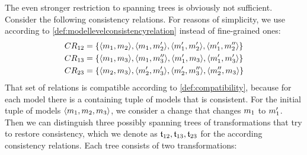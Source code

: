 The even stronger restriction to spanning trees is obviously not sufficient.
Consider the following consistency relations. For reasons of simplicity, we use \modellevelconsistencyrelations according to \autoref{def:modellevelconsistencyrelation} instead of fine-grained ones:
\begin{align*}
    & 
    CR_{12} = \{ \langle m_{1}, m_{2} \rangle, \langle m_{1}, m_{2}' \rangle, \langle m_{1}', m_{2}' \rangle, \langle m_{1}', m_{2}'' \rangle \} \\
    & 
    CR_{13} = \{ \langle m_{1}, m_{3} \rangle, \langle m_{1}, m_{3}'' \rangle, \langle m_{1}', m_{3} \rangle, \langle m_{1}', m_{3}' \rangle \} \\
    & 
    CR_{23} = \{ \langle m_{2}, m_{3} \rangle, \langle m_{2}', m_{3}' \rangle, \langle m_{2}', m_{3}'' \rangle, \langle m_{2}'', m_{3} \rangle \} 
\end{align*}
That set of relations is compatible according to \autoref{def:compatibility}, because for each model there is a containing tuple of models that is consistent.
For the initial tuple of models $\langle m_{1}, m_{2}, m_{3} \rangle$, we consider a change that changes $m_{1}$ to $m_{1}'$.
Then we can distinguish three possibly spanning trees of transformations that try to restore consistency, which we denote as $\mathfrak{t}_{12}, \mathfrak{t}_{13}, \mathfrak{t}_{23}$ for the according consistency relations.
Each tree consists of two transformations:
